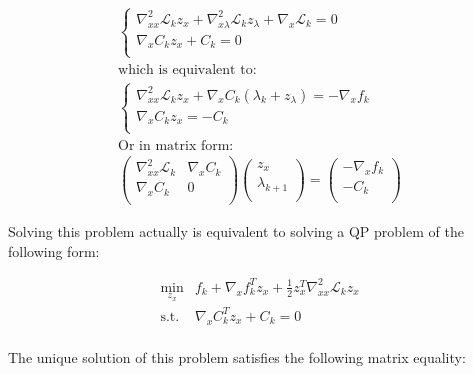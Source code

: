 \begin{equation}
  \label{KKT_1st_order}
  \begin{array}{l}

  \left\{
\begin{array}{l}
  \nabla_{xx}^2\mathcal{L}_k z_x + \nabla_{x\lambda}^2\mathcal{L}_k z_\lambda + \nabla_x\mathcal{L}_k  = 0\\
  \nabla_x C_k z_x + C_k = 0\\
\end{array}
\right. \\
\text{which is equivalent to:}\\
  \left\{
\begin{array}{l}
  \nabla_{xx}^2\mathcal{L}_k z_x + \nabla_{x}C_k (\lambda_k + z_\lambda) = - \nabla_{x}f_k\\
  \nabla_x C_k z_x = - C_k \\
\end{array}
\right. \\
\text{Or in matrix form:}\\
  \begin{pmatrix}
      \nabla_{xx}^2\mathcal{L}_k & \nabla_x C_k\\
      \nabla_x C_k & 0\\
  \end{pmatrix}
  \begin{pmatrix}
      z_x\\
      \lambda_{k+1}\\
  \end{pmatrix}
  =
  \begin{pmatrix}
      -\nabla_{x}f_k\\
      -C_k\\
  \end{pmatrix}
  \end{array}
\end{equation}

Solving this problem actually is equivalent to solving a QP problem of the following form:

\begin{equation}
  \begin{array}{ll}
    \min\limits_{z_x} &f_k + \nabla_x f_k ^T z_x + \frac{1}{2} z_x^T\nabla_{xx}^2\mathcal{L}_k z_x \\
    \text{s.t.} & \nabla_x C_k^T z_x + C_k = 0\\
  \end{array}
\end{equation}

The unique solution of this problem satisfies the following matrix equality:

